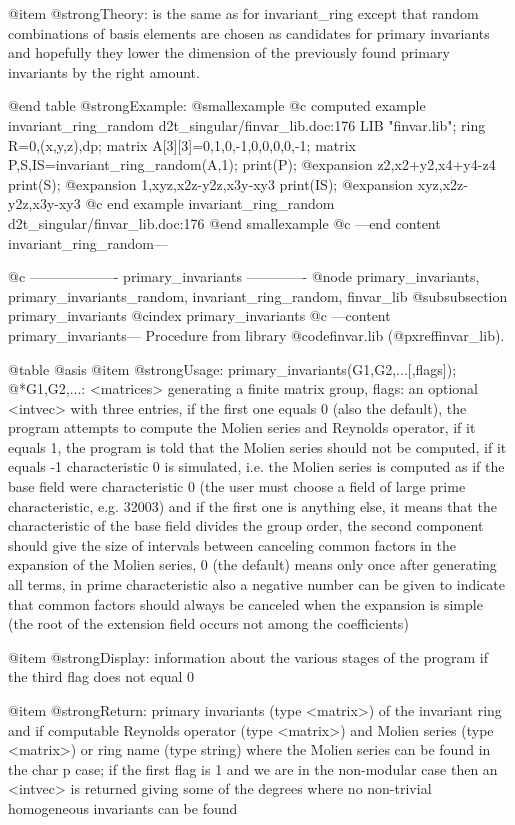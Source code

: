 @item @strong{Theory:}
is the same as for invariant_ring except that random combinations of
basis elements are chosen as candidates for primary invariants and
hopefully they lower the dimension of the previously found primary
invariants by the right amount.

@end table
@strong{Example:}
@smallexample
@c computed example invariant_ring_random d2t_singular/finvar_lib.doc:176 
LIB "finvar.lib";
ring R=0,(x,y,z),dp;
matrix A[3][3]=0,1,0,-1,0,0,0,0,-1;
matrix P,S,IS=invariant_ring_random(A,1);
print(P);
@expansion{} z2,x2+y2,x4+y4-z4
print(S);
@expansion{} 1,xyz,x2z-y2z,x3y-xy3
print(IS);
@expansion{} xyz,x2z-y2z,x3y-xy3
@c end example invariant_ring_random d2t_singular/finvar_lib.doc:176
@end smallexample
@c ---end content invariant_ring_random---

@c ------------------- primary_invariants -------------
@node primary_invariants, primary_invariants_random, invariant_ring_random, finvar_lib
@subsubsection primary_invariants
@cindex primary_invariants
@c ---content primary_invariants---
Procedure from library @code{finvar.lib} (@pxref{finvar_lib}).

@table @asis
@item @strong{Usage:}
primary_invariants(G1,G2,...[,flags]);
@*G1,G2,...: <matrices> generating a finite matrix group, flags: an
optional <intvec> with three entries, if the first one equals 0 (also
the default), the program attempts to compute the Molien series and
Reynolds operator, if it equals 1, the program is told that the
Molien series should not be computed, if it equals -1 characteristic 0
is simulated, i.e. the Molien series is computed as if the base field
were characteristic 0 (the user must choose a field of large prime
characteristic, e.g. 32003) and if the first one is anything else, it
means that the characteristic of the base field divides the group
order, the second component should give the size of intervals between
canceling common factors in the expansion of the Molien series, 0 (the
default) means only once after generating all terms, in prime
characteristic also a negative number can be given to indicate that
common factors should always be canceled when the expansion is simple
(the root of the extension field occurs not among the coefficients)

@item @strong{Display:}
information about the various stages of the program if the third
flag does not equal 0

@item @strong{Return:}
primary invariants (type <matrix>) of the invariant ring and if
computable Reynolds operator (type <matrix>) and Molien series (type
<matrix>) or ring name (type string) where the Molien series
can be found in the char p case; if the first flag is 1 and we are in
the non-modular case then an <intvec> is returned giving some of the
degrees where no non-trivial homogeneous invariants can be found

